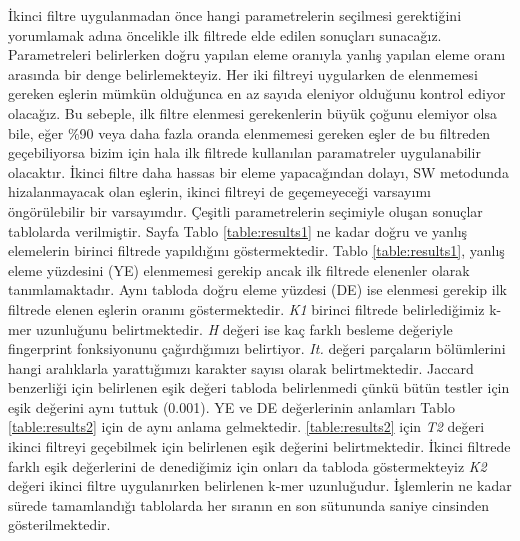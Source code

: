İkinci filtre uygulanmadan önce hangi parametrelerin seçilmesi gerektiğini yorumlamak adına öncelikle ilk filtrede elde edilen sonuçları sunacağız. Parametreleri belirlerken doğru yapılan eleme oranıyla yanlış yapılan eleme oranı arasında bir denge belirlemekteyiz. Her iki filtreyi uygularken de elenmemesi gereken eşlerin mümkün olduğunca en az sayıda eleniyor olduğunu kontrol ediyor olacağız. Bu sebeple, ilk filtre elenmesi gerekenlerin büyük çoğunu elemiyor olsa bile, eğer \%90 veya daha fazla oranda elenmemesi gereken eşler de bu filtreden geçebiliyorsa bizim için hala ilk filtrede kullanılan paramatreler uygulanabilir olacaktır. İkinci filtre daha hassas bir eleme yapacağından dolayı, SW metodunda hizalanmayacak olan eşlerin, ikinci filtreyi de geçemeyeceği varsayımı öngörülebilir bir varsayımdır. Çeşitli parametrelerin seçimiyle oluşan sonuçlar tablolarda verilmiştir. Sayfa \pageref{table:results1} Tablo \ref{table:results1} ne kadar doğru ve yanlış elemelerin birinci filtrede yapıldığını göstermektedir. Tablo \ref{table:results1}, yanlış eleme yüzdesini (YE) elenmemesi gerekip ancak ilk filtrede elenenler olarak tanımlamaktadır. Aynı tabloda doğru eleme yüzdesi (DE) ise elenmesi gerekip ilk filtrede elenen eşlerin oranını göstermektedir. \textit{K1} birinci filtrede belirlediğimiz k-mer uzunluğunu belirtmektedir. \textit{H} değeri ise kaç farklı besleme değeriyle fingerprint fonksiyonunu çağırdığımızı belirtiyor. \textit{It.} değeri parçaların bölümlerini hangi aralıklarla yarattığımızı karakter sayısı olarak belirtmektedir. Jaccard benzerliği için belirlenen eşik değeri tabloda belirlenmedi çünkü bütün testler için eşik değerini aynı tuttuk (0.001). YE ve DE değerlerinin anlamları Tablo \ref{table:results2} için de aynı anlama gelmektedir. \ref{table:results2} için \textit{T2} değeri ikinci filtreyi geçebilmek için belirlenen eşik değerini belirtmektedir. İkinci filtrede farklı eşik değerlerini de denediğimiz için onları da tabloda göstermekteyiz \textit{K2} değeri ikinci filtre uygulanırken belirlenen k-mer uzunluğudur. İşlemlerin ne kadar sürede tamamlandığı tablolarda her sıranın en son sütununda saniye cinsinden gösterilmektedir.

